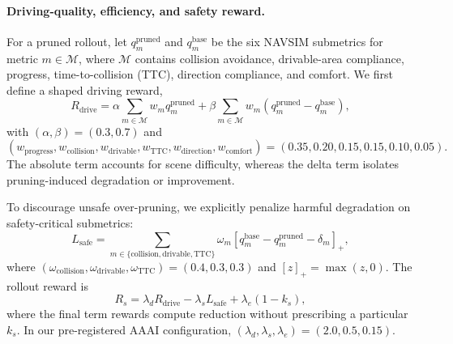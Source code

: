 \documentclass[letterpaper]{article} %
\begin{document}
\paragraph{Driving-quality, efficiency, and safety reward.}
For a pruned rollout, let $q_m^{\mathrm{pruned}}$ and
$q_m^{\mathrm{base}}$ be the six NAVSIM submetrics for metric
$m\in\mathcal{M}$, where $\mathcal{M}$ contains collision avoidance,
drivable-area compliance, progress, time-to-collision (TTC), direction
compliance, and comfort. We first define a shaped driving reward,
\begin{equation}
R_{\mathrm{drive}}=
\alpha\sum_{m\in\mathcal{M}}w_mq_m^{\mathrm{pruned}}
+\beta\sum_{m\in\mathcal{M}}w_m
\left(q_m^{\mathrm{pruned}}-q_m^{\mathrm{base}}\right),
\label{eq:driving-reward}
\end{equation}
with $(\alpha,\beta)=(0.3,0.7)$ and
\begin{equation}
(w_{\mathrm{progress}},w_{\mathrm{collision}},
w_{\mathrm{drivable}},w_{\mathrm{TTC}},
w_{\mathrm{direction}},w_{\mathrm{comfort}})
=
(0.35,0.20,0.15,0.15,0.10,0.05).
\end{equation}
The absolute term accounts for scene difficulty, whereas the delta term
isolates pruning-induced degradation or improvement.

To discourage unsafe over-pruning, we explicitly penalize harmful degradation
on safety-critical submetrics:
\begin{equation}
L_{\mathrm{safe}} =
\sum_{m\in\{\mathrm{collision},\mathrm{drivable},\mathrm{TTC}\}}
\omega_m
\left[
q_m^{\mathrm{base}}-q_m^{\mathrm{pruned}}-\delta_m
\right]_+,
\label{eq:safety-loss}
\end{equation}
where
$(\omega_{\mathrm{collision}},\omega_{\mathrm{drivable}},
\omega_{\mathrm{TTC}})=(0.4,0.3,0.3)$ and
$[z]_+=\max(z,0)$. The rollout reward is
\begin{equation}
R_s =
\lambda_dR_{\mathrm{drive}}
-\lambda_sL_{\mathrm{safe}}
+\lambda_e(1-k_s),
\label{eq:total-reward}
\end{equation}
where the final term rewards compute reduction without prescribing a particular
$k_s$. In our pre-registered AAAI configuration,
$(\lambda_d,\lambda_s,\lambda_e)=(2.0,0.5,0.15)$.
\end{document}
